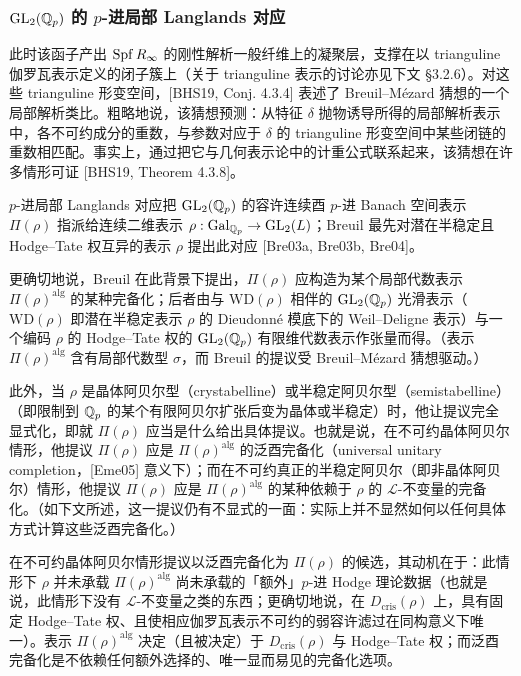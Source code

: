 \subsubsection{$\mathrm{GL}_2(\mathbb{Q}_p)$ 的 $p$-进局部 Langlands 对应}

此时该函子产出 $\operatorname{Spf} R_\infty$ 的刚性解析一般纤维上的凝聚层，支撑在以 trianguline 伽罗瓦表示定义的闭子簇上（关于 trianguline 表示的讨论亦见下文 §3.2.6）。对这些 trianguline 形变空间，[BHS19, Conj. 4.3.4] 表述了 Breuil--Mézard 猜想的一个局部解析类比。粗略地说，该猜想预测：从特征 $\delta$ 抛物诱导所得的局部解析表示中，各不可约成分的重数，与参数对应于 $\delta$ 的 trianguline 形变空间中某些闭链的重数相匹配。事实上，通过把它与几何表示论中的计重公式联系起来，该猜想在许多情形可证 [BHS19, Theorem 4.3.8]。

$p$-进局部 Langlands 对应把 $\mathrm{GL}_2(\mathbb{Q}_p)$ 的容许连续酉 $p$-进 Banach 空间表示 $\Pi(\rho)$ 指派给连续二维表示 $\rho:\mathrm{Gal}_{\mathbb{Q}_p}\to\mathrm{GL}_2(L)$；Breuil 最先对潜在半稳定且 Hodge--Tate 权互异的表示 $\rho$ 提出此对应 [Bre03a, Bre03b, Bre04]。

更确切地说，Breuil 在此背景下提出，$\Pi(\rho)$ 应构造为某个局部代数表示 $\Pi(\rho)^{\mathrm{alg}}$ 的某种完备化；后者由与 $\mathrm{WD}(\rho)$ 相伴的 $\mathrm{GL}_2(\mathbb{Q}_p)$ 光滑表示（$\mathrm{WD}(\rho)$ 即潜在半稳定表示 $\rho$ 的 Dieudonné 模底下的 Weil--Deligne 表示）与一个编码 $\rho$ 的 Hodge--Tate 权的 $\mathrm{GL}_2(\mathbb{Q}_p)$ 有限维代数表示作张量而得。（表示 $\Pi(\rho)^{\mathrm{alg}}$ 含有局部代数型 $\sigma$，而 Breuil 的提议受 Breuil--Mézard 猜想驱动。）

此外，当 $\rho$ 是晶体阿贝尔型（crystabelline）或半稳定阿贝尔型（semistabelline）（即限制到 $\mathbb{Q}_p$ 的某个有限阿贝尔扩张后变为晶体或半稳定）时，他让提议完全显式化，即就 $\Pi(\rho)$ 应当是什么给出具体提议。也就是说，在不可约晶体阿贝尔情形，他提议 $\Pi(\rho)$ 应是 $\Pi(\rho)^{\mathrm{alg}}$ 的泛酉完备化（universal unitary completion，[Eme05] 意义下）；而在不可约真正的半稳定阿贝尔（即非晶体阿贝尔）情形，他提议 $\Pi(\rho)$ 应是 $\Pi(\rho)^{\mathrm{alg}}$ 的某种依赖于 $\rho$ 的 $\mathcal{L}$-不变量的完备化。（如下文所述，这一提议仍有不显式的一面：实际上并不显然如何以任何具体方式计算这些泛酉完备化。）

在不可约晶体阿贝尔情形提议以泛酉完备化为 $\Pi(\rho)$ 的候选，其动机在于：此情形下 $\rho$ 并未承载 $\Pi(\rho)^{\mathrm{alg}}$ 尚未承载的「额外」$p$-进 Hodge 理论数据（也就是说，此情形下没有 $\mathcal{L}$-不变量之类的东西；更确切地说，在 $D_{\mathrm{cris}}(\rho)$ 上，具有固定 Hodge--Tate 权、且使相应伽罗瓦表示不可约的弱容许滤过在同构意义下唯一）。表示 $\Pi(\rho)^{\mathrm{alg}}$ 决定（且被决定）于 $D_{\mathrm{cris}}(\rho)$ 与 Hodge--Tate 权；而泛酉完备化是不依赖任何额外选择的、唯一显而易见的完备化选项。

